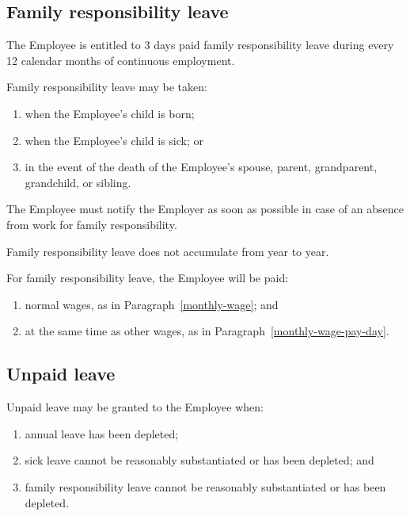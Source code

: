 \documentclass[a4paper,11pt]{article}
\begin{document}
\subsection{Family responsibility leave}
\label{family-responsibility-leave}

\para The Employee is entitled to 3 days paid family responsibility leave during
every 12 calendar months of continuous employment.

\para Family responsibility leave may be taken:

\begin{enumerate}

  \item when the Employee's child is born;

  \item when the Employee's child is sick; or

  \item in the event of the death of the Employee's spouse, parent, grandparent,
    grandchild, or sibling.

\end{enumerate}

\para The Employee must notify the Employer as soon as possible in case of an
absence from work for family responsibility.

\para Family responsibility leave does not accumulate from year to year.

\para For family responsibility leave, the Employee will be paid:

\begin{enumerate}

  \item normal wages, as in Paragraph~\ref{monthly-wage}; and

  \item at the same time as other wages, as in
    Paragraph~\ref{monthly-wage-pay-day}.

\end{enumerate}

\subsection{Unpaid leave}
\label{unpaid-leave}

\para Unpaid leave may be granted to the Employee when:

\begin{enumerate}

  \item annual leave has been depleted;

  \item sick leave cannot be reasonably substantiated or has been depleted; and

  \item family responsibility leave cannot be reasonably substantiated or has
    been depleted.

\end{enumerate}
\end{document}
